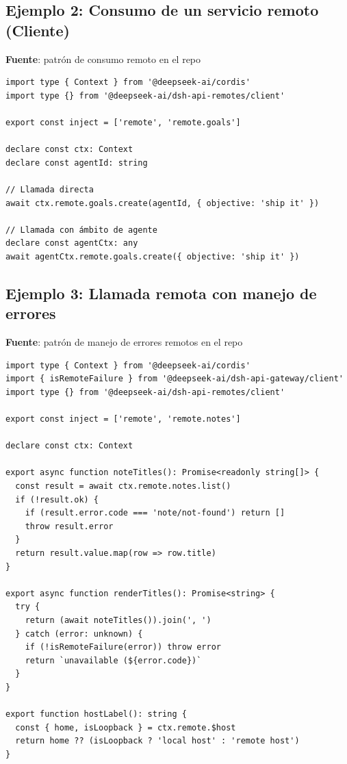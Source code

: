 \documentclass[11pt,a4paper]{article}
\begin{document}
\subsection*{Ejemplo 2: Consumo de un servicio remoto (Cliente)}


\textbf{Fuente}: patrón de consumo remoto en el repo


\begin{lstlisting}
import type { Context } from '@deepseek-ai/cordis'
import type {} from '@deepseek-ai/dsh-api-remotes/client'

export const inject = ['remote', 'remote.goals']

declare const ctx: Context
declare const agentId: string

// Llamada directa
await ctx.remote.goals.create(agentId, { objective: 'ship it' })

// Llamada con ámbito de agente
declare const agentCtx: any
await agentCtx.remote.goals.create({ objective: 'ship it' })
\end{lstlisting}


\subsection*{Ejemplo 3: Llamada remota con manejo de errores}


\textbf{Fuente}: patrón de manejo de errores remotos en el repo


\begin{lstlisting}
import type { Context } from '@deepseek-ai/cordis'
import { isRemoteFailure } from '@deepseek-ai/dsh-api-gateway/client'
import type {} from '@deepseek-ai/dsh-api-remotes/client'

export const inject = ['remote', 'remote.notes']

declare const ctx: Context

export async function noteTitles(): Promise<readonly string[]> {
  const result = await ctx.remote.notes.list()
  if (!result.ok) {
    if (result.error.code === 'note/not-found') return []
    throw result.error
  }
  return result.value.map(row => row.title)
}

export async function renderTitles(): Promise<string> {
  try {
    return (await noteTitles()).join(', ')
  } catch (error: unknown) {
    if (!isRemoteFailure(error)) throw error
    return `unavailable (${error.code})`
  }
}

export function hostLabel(): string {
  const { home, isLoopback } = ctx.remote.$host
  return home ?? (isLoopback ? 'local host' : 'remote host')
}
\end{lstlisting}
\end{document}
